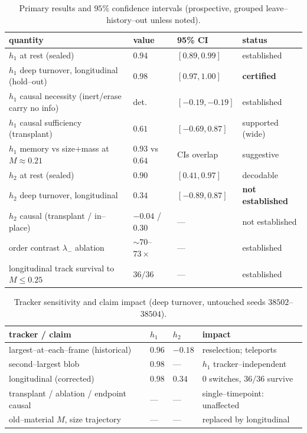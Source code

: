 \documentclass[11pt]{article}
\begin{document}
\begin{table}[t]\centering\small
\caption{Primary results and $95\%$ confidence intervals (prospective, grouped leave--history--out unless noted).}
\label{tab:results}
\begin{tabular}{@{}llll@{}}\toprule
quantity & value & 95\% CI & status\\\midrule
$h_1$ at rest (sealed) & $0.94$ & $[0.89,0.99]$ & established\\
$h_1$ deep turnover, longitudinal (hold--out) & $0.98$ & $[0.97,1.00]$ & \textbf{certified}\\
$h_1$ causal necessity (inert/erase carry no info) & det. & $[-0.19,-0.19]$ & established\\ $h_1$ causal sufficiency (transplant) & $0.61$ & $[-0.69,0.87]$ & supported (wide)\\
$h_1$ memory vs size+mass at $M{\approx}0.21$ & $0.93$ vs $0.64$ & CIs overlap & suggestive\\
$h_2$ at rest (sealed) & $0.90$ & $[0.41,0.97]$ & decodable\\
$h_2$ deep turnover, longitudinal & $0.34$ & $[-0.89,0.87]$ & \textbf{not established}\\
$h_2$ causal (transplant / in--place) & $-0.04$ / $0.30$ & --- & not established\\
order contrast $\lambda_-$ ablation & $\sim$$70$--$73\times$ & --- & established\\
longitudinal track survival to $M{\le}0.25$ & $36/36$ & --- & established\\\bottomrule
\end{tabular}
\end{table}
\begin{table}[t]\centering\small
\caption{Tracker sensitivity and claim impact (deep turnover, untouched seeds $38502$--$38504$).}
\label{tab:tracker}
\begin{tabular}{@{}llll@{}}\toprule
tracker / claim & $h_1$ & $h_2$ & impact\\\midrule
largest--at--each--frame (historical) & $0.96$ & $-0.18$ & reselection; teleports\\
second--largest blob & $0.98$ & --- & $h_1$ tracker--independent\\
longitudinal (corrected) & $0.98$ & $0.34$ & $0$ switches, $36/36$ survive\\
transplant / ablation / endpoint causal & --- & --- & single--timepoint: unaffected\\
old--material $M$, size trajectory & --- & --- & replaced by longitudinal\\\bottomrule
\end{tabular}
\end{table}
\end{document}
